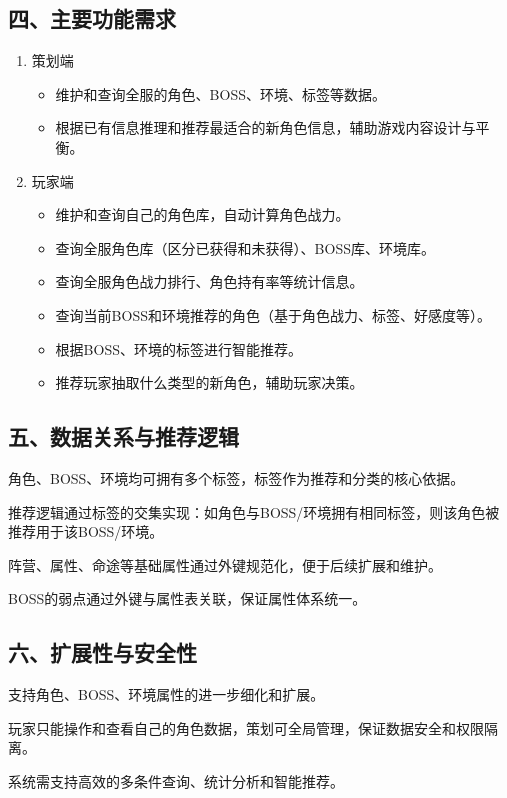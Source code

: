 \documentclass{ctexart}
\begin{document}
\subsection{四、主要功能需求}
\begin{enumerate}
  \item 策划端
    \begin{itemize}
      \item 维护和查询全服的角色、BOSS、环境、标签等数据。
      \item 根据已有信息推理和推荐最适合的新角色信息，辅助游戏内容设计与平衡。
    \end{itemize}
  \item 玩家端
    \begin{itemize}
      \item 维护和查询自己的角色库，自动计算角色战力。
      \item 查询全服角色库（区分已获得和未获得）、BOSS库、环境库。
      \item 查询全服角色战力排行、角色持有率等统计信息。
      \item 查询当前BOSS和环境推荐的角色（基于角色战力、标签、好感度等）。
      \item 根据BOSS、环境的标签进行智能推荐。
      \item 推荐玩家抽取什么类型的新角色，辅助玩家决策。
    \end{itemize}
\end{enumerate}

\subsection{五、数据关系与推荐逻辑}
角色、BOSS、环境均可拥有多个标签，标签作为推荐和分类的核心依据。

推荐逻辑通过标签的交集实现：如角色与BOSS/环境拥有相同标签，则该角色被推荐用于该BOSS/环境。

阵营、属性、命途等基础属性通过外键规范化，便于后续扩展和维护。

BOSS的弱点通过外键与属性表关联，保证属性体系统一。

\subsection{六、扩展性与安全性}
支持角色、BOSS、环境属性的进一步细化和扩展。

玩家只能操作和查看自己的角色数据，策划可全局管理，保证数据安全和权限隔离。

系统需支持高效的多条件查询、统计分析和智能推荐。
\end{document}
